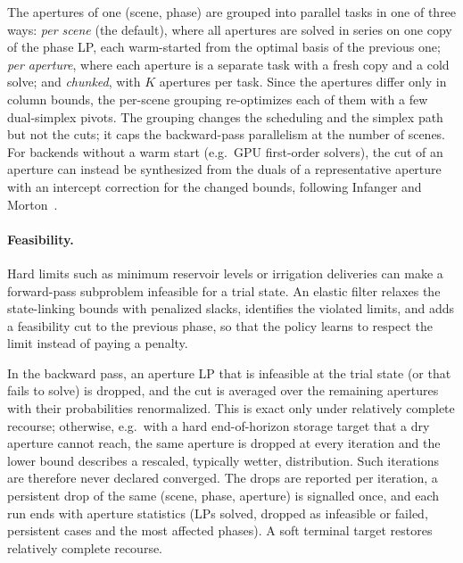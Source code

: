 The apertures of one (scene, phase) are grouped into parallel tasks in
one of three ways: \emph{per scene} (the default), where all apertures
are solved in series on one copy of the phase LP, each warm-started from
the optimal basis of the previous one; \emph{per aperture}, where each
aperture is a separate task with a fresh copy and a cold solve; and
\emph{chunked}, with $K$ apertures per task.  Since the apertures differ
only in column bounds, the per-scene grouping re-optimizes each of them
with a few dual-simplex pivots.  The grouping changes the scheduling and
the simplex path but not the cuts; it caps the backward-pass
parallelism at the number of scenes.  For backends without a warm start
(e.g.\ GPU first-order solvers), the cut of an aperture can instead be
synthesized from the duals of a representative aperture with an
intercept correction for the changed bounds, following Infanger and
Morton~\cite{infanger1996cutsharing}.

\paragraph{Feasibility.}
Hard limits such as minimum reservoir levels or irrigation deliveries
can make a forward-pass subproblem infeasible for a trial state.  An
elastic filter relaxes the state-linking bounds with penalized slacks,
identifies the violated limits, and adds a feasibility cut to the
previous phase, so that the policy learns to respect the limit instead
of paying a penalty.

In the backward pass, an aperture LP that is infeasible at the trial
state (or that fails to solve) is dropped, and the cut is averaged over
the remaining apertures with their probabilities renormalized.  This is
exact only under relatively complete recourse; otherwise, e.g.\ with a
hard end-of-horizon storage target that a dry aperture cannot reach,
the same aperture is dropped at every iteration and the lower bound
describes a rescaled, typically wetter, distribution.  Such iterations
are therefore never declared converged.  The drops are reported per
iteration, a persistent drop of the same (scene, phase, aperture) is
signalled once, and each run ends with aperture statistics (LPs solved,
dropped as infeasible or failed, persistent cases and the most affected
phases).  A soft terminal target restores relatively complete recourse.

